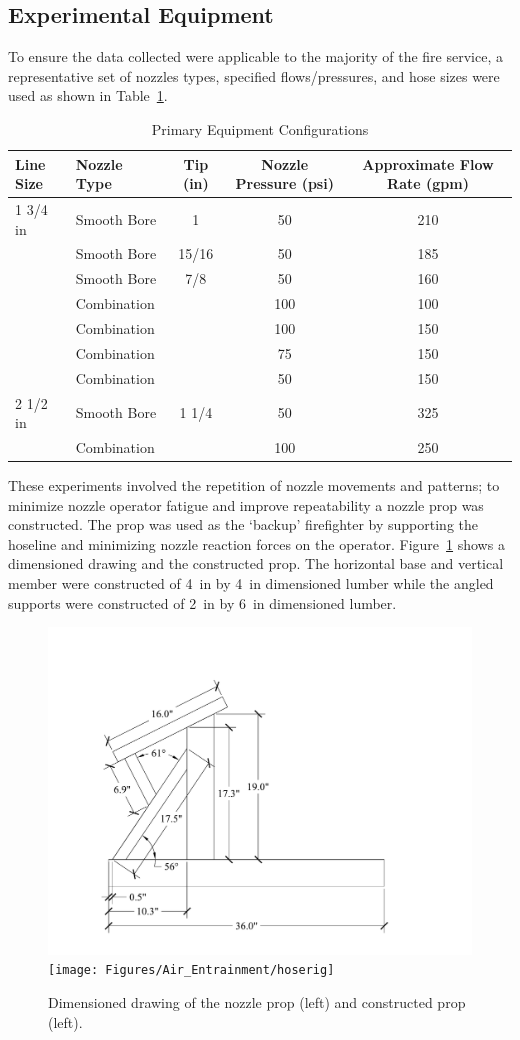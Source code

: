 \documentclass[12pt,oneside]{book}
\begin{document}
\subsection{Experimental Equipment}

To ensure the data collected were applicable to the majority of the fire service, a representative set of nozzles types, specified flows/pressures, and hose sizes were used as shown in Table~\ref{tab:nozzles_used_detail}.

\begin{table}[!ht]
\centering
\caption{Primary Equipment Configurations}
\label{tab:nozzles_used_detail}
\begin{tabular}{llccc}
\toprule[1.5pt]
Line Size & Nozzle Type & Tip (in) & Nozzle Pressure (psi) & Approximate Flow Rate (gpm) \\ 
\midrule
1 3/4 in & Smooth Bore          & 1      & 50 & 210 \\
          & Smooth Bore          & 15/16  & 50 & 185 \\
          & Smooth Bore          & 7/8    & 50 & 160 \\
          & Combination          &        & 100 & 100 \\
          & Combination          &        & 100 & 150 \\
          & Combination          &        & 75 & 150 \\
          & Combination          &        & 50 & 150 \\ \midrule
2 1/2 in & Smooth Bore          & 1 1/4  & 50 & 325 \\
          & Combination          &        & 100 & 250 \\
\bottomrule[1.25pt]
\end{tabular}
\end{table}

These experiments involved the repetition of nozzle movements and patterns; to minimize nozzle operator fatigue and improve repeatability a nozzle prop was constructed. The prop was used as the `backup' firefighter by supporting the hoseline and minimizing nozzle reaction forces on the operator. Figure~\ref{fig:Nozzle_Prop} shows a dimensioned drawing and the constructed prop. The horizontal base and vertical member were constructed of 4~in by 4~in dimensioned lumber while the angled supports were constructed of 2~in by 6~in dimensioned lumber.

\begin{figure}[!ht]
\centering
    \includegraphics[width=.4\columnwidth]{Figures/Water_Distribution/GIBside}
	\texttt{[image: Figures/Air\_Entrainment/hoserig]}
	\caption[Nozzle Prop]{Dimensioned drawing of the nozzle prop (left) and constructed prop (left).}
	\label{fig:Nozzle_Prop}
\end{figure}
\end{document}
